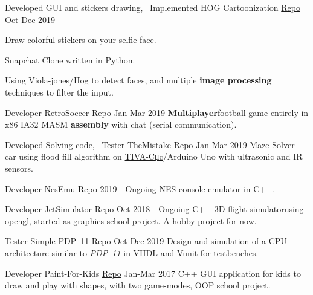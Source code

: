 \begin{cventries}
  \cventry
    {Developed GUI and stickers drawing, ~Implemented HOG} %
    {Cartoonization \tiny{\href{http://github.com/Abdulrahman-Khalid/Cartoonization/}{Repo}}} %
    {} %
    {Oct-Dec 2019} %
    {
      \begin{cvitems} %
        \item {Draw colorful stickers on your selfie face.}
        \item {Snapchat Clone written in Python.}
        \item {Using ​Viola-jones/Hog ​to detect faces, and multiple \textbf{image processing} techniques to filter the input.}
      \end{cvitems}
    }

  \cventry
    {Developer} %
    {RetroSoccer \tiny{\href{https://github.com/mido3ds/retrosoccer}{Repo}}} %
    {} %
    {Jan-Mar 2019} %
    {
      {\textbf{Multiplayer​} football ​game​ entirely in x86 IA32 MASM \textbf{​assembly​} with chat (serial communication).}
    }

    \cventry
    {Developed Solving code, ~Tester} %
    {TheMistake \tiny{\href{https://www.github.com/Abdulrahman-Khalid/mazeSolver}{Repo}}} %
    {} %
    {Jan-Mar 2019} %
    {
      {Maze Solver ​ car using flood fill algorithm on \href{http://www.ti.com/tool/EK-TM4C123GXL}{​TIVA-C ​μc}​/Arduino Uno with ultrasonic and IR sensors.}
    }

    \cventry
    {Developer} %
    {NesEmu \tiny{\href{https://github.com/mido3ds/nesemu}{Repo}}} %
    {} %
    {2019 - Ongoing} %
    {
      NES console ​emulator​ in C++.
    }

  \cventry
    {Developer} %
    {JetSimulator \tiny{\href{https://github.com/mido3ds/JetSimulator}{Repo}}} %
    {} %
    {Oct 2018 - Ongoing} %
    {
      {C++ 3D​ ​flight simulator​ using opengl, started as graphics school project. A hobby project for now.}
    }

    \cventry
    {Tester} %
    {Simple PDP--11 \tiny{\href{https://github.com/mido3ds/simple-pdp11}{Repo}}} %
    {} %
    {Oct-Dec 2019} %
    {
      Design and simulation of a CPU architecture similar to \emph{PDP--11} in VHDL and Vunit for testbenches.
    }

  \cventry
    {Developer} %
    {Paint-For-Kids \tiny{\href{https://github.com/mido3ds/paint-for-kids}{Repo}}} %
    {} %
    {Jan-Mar 2017} %
    {
      {C++ ​GUI​ application for kids to ​ draw​ and play with shapes, with ​two game-modes​, OOP school project.}
    }


\end{cventries}
